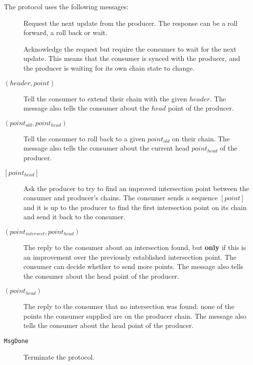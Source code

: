 \documentclass{report}
\newcommand{\msg}[1]{\texttt{#1}}
\newcommand{\MsgDone}{\msg{MsgDone}}
\renewcommand{\langle}{[}
\renewcommand{\rangle}{]}
\theoremstyle{definition}{
  \newtheorem{lemma}{Lemma}[section] %
  \newtheorem{definition}[lemma]{Definition}
}
\theoremstyle{theorem}{
  \newtheorem{invariant}[lemma]{Invariant}
  \newtheorem{proofobligation}[lemma]{Proof Obligation}
}
\numberwithin{equation}{lemma}
\begin{document}
The protocol uses the following messages:
\begin{description}
\item [\RequestNext]
      Request the next update from the producer.
      The response can be a roll forward, a roll back or wait.
\item [\AwaitReply]
      Acknowledge the request but require the consumer to wait for the next update.
      This means that the consumer is synced with the producer, and
      the producer is waiting for its own chain state to change.
\item [\RollForward{} {\boldmath $(header,point)$}]
      Tell the consumer to extend their chain with the given $header$.
      The message also tells the consumer about the $head$ point of the producer.
\item [\RollBackward{} {\boldmath $(point_{old},point_{head})$}]
      Tell the consumer to roll back to a given $point_{old}$ on their chain.
      The message also tells the consumer about the current head $point_{head}$ of the producer.
\item [\FindIntersect{} {\boldmath $\langle point_{head} \rangle $}]
      Ask the producer to try to find an improved intersection point between
      the consumer and producer's chains.
      The consumer sends a sequence {\boldmath $\langle point \rangle $}
      and it is up to the producer
      to find the first intersection point on its chain and send it back to the consumer.
\item [\IntersectImproved{} {\boldmath $(point_{intersect},point_{head})$}]
      The reply to the consumer about an intersection found, but {\bf only} if this
      is an improvement over the previously established intersection point.
      The consumer can decide whether to send more points.
      The message also tells the consumer about the head point of the producer.
\item [\IntersectUnchanged{} {\boldmath $(point_{head})$}]
      The reply to the consumer that no intersection was found: none of the
      points the consumer supplied are on the producer chain.
      The message also tells the consumer about the head point of the producer.
\item [\MsgDone]
      Terminate the protocol.
\end{description}
\end{document}
